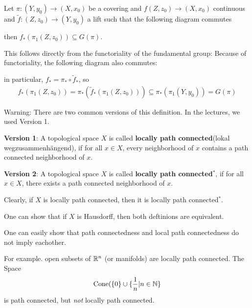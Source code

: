 \begin{rem}[]
  Let $\pi:(Y,y_0) \to (X,x_0)$ be a covering and $f(Z,z_0) \to (X,x_0)$ continuous and $\tilde{f}:(Z,z_0) \to (Y,y_0)$ a lift such that the following diagram commutes
  \begin{center}
  \end{center}
  then $f_{\ast}(\pi_1(Z,z_0)) \subseteq G(\pi)$.

  This follows directly from the functoriality of the fundamental group:
  Because of functoriality, the following diagram also commutes:
  \begin{center}
  \end{center}
  in particular, $f_{\ast} = \pi_{\ast} \circ \tilde{f}_{\ast}$, so 
  \begin{align*}
    f_{\ast}(\pi_1(Z,z_0)) = \pi_{\ast}(\tilde{f}_{\ast}(\pi_1(Z,z_0))) \subseteq \pi_{\ast}(\pi_1(Y,y_0)) = G(\pi)
  \end{align*}
\end{rem}

\begin{dfn}[]
  Warning: There are two common versions of this definition. In the lectures, we used Version 1.

  \textbf{Version 1}:
  A topological space $X$ is called \textbf{locally path connected}(lokal wegzusammenhängend), if for all $x \in X$, every neighborhood of $x$ contains a path connected neighborhood of $x$.

  \textbf{Version 2}:
  A topological space $X$ is called \textbf{locally path connected$^{\ast}$}, if for all $x \in X$, there exists a path connected neighborhood of $x$.
\end{dfn}
Clearly, if $X$ is locally path connected, then it is locally path connected$^{\ast}$.

One can show that if $X$ is Hausdorff, then both deftinions are equivalent.

One can easily show that path connectedness and local path connectedness do not imply eachother.
\begin{ex}[]
  For example. open subsets of $\mathbb{R}^{n}$ (or manifolds) are locally path connected.
  The Space 
  \begin{align*}
    \text{Cone}(\{0\} \cup \{\frac{1}{n}|n \in \mathbb{N}\}
  \end{align*}
  is path connected, but \emph{not} locally path connected.
\end{ex}


